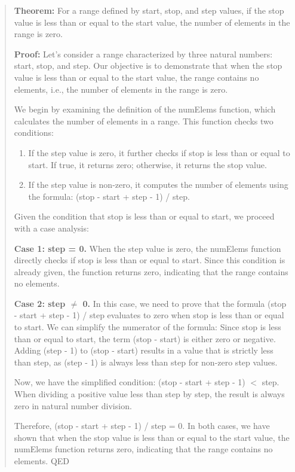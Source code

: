 \begin{quote}
\textbf{Theorem:} For a range defined by start, stop, and step values, if the stop value is less than or equal to the start value, the number of elements in the range is zero.

\textbf{Proof:} Let's consider a range characterized by three natural numbers: start, stop, and step. Our objective is to demonstrate that when the stop value is less than or equal to the start value, the range contains no elements, i.e., the number of elements in the range is zero.

We begin by examining the definition of the numElems function, which calculates the number of elements in a range. This function checks two conditions:
\begin{enumerate}
\item If the step value is zero, it further checks if stop is less than or equal to start. If true, it returns zero; otherwise, it returns the stop value.
\item If the step value is non-zero, it computes the number of elements using the formula: (stop - start + step - 1) / step.
\end{enumerate}

Given the condition that stop is less than or equal to start, we proceed with a case analysis:

\textbf{Case 1: step = 0.} When the step value is zero, the numElems function directly checks if stop is less than or equal to start. Since this condition is already given, the function returns zero, indicating that the range contains no elements.

\textbf{Case 2: step $\neq$ 0.} In this case, we need to prove that the formula (stop - start + step - 1) / step evaluates to zero when stop is less than or equal to start. We can simplify the numerator of the formula: Since stop is less than or equal to start, the term (stop - start) is either zero or negative. Adding (step - 1) to (stop - start) results in a value that is strictly less than step, as (step - 1) is always less than step for non-zero step values.

Now, we have the simplified condition: (stop - start + step - 1) $<$ step. When dividing a positive value less than step by step, the result is always zero in natural number division.

Therefore, (stop - start + step - 1) / step = 0. In both cases, we have shown that when the stop value is less than or equal to the start value, the numElems function returns zero, indicating that the range contains no elements. QED
\end{quote}

